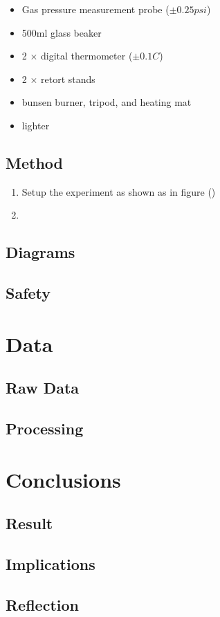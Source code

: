 \documentclass[a4paper,12pt]{article}
\begin{document}
\begin{itemize}
    \item Gas pressure measurement probe ($\pm 0.25\si{psi}$)
    \item 500ml glass beaker
    \item 2 $\times$ digital thermometer ($\pm 0.1\si{C}$)
    \item 2 $\times$ retort stands
    \item bunsen burner, tripod, and heating mat
    \item lighter
\end{itemize}

\subsection{Method}


\begin{enumerate}
    \item Setup the experiment as shown as in figure ()
    \item 

\end{enumerate}


\subsection{Diagrams}
\subsection{Safety}

\section{Data}
\subsection{Raw Data}
\subsection{Processing}

\section{Conclusions}
\subsection{Result}
\subsection{Implications}
\subsection{Reflection}
\end{document}
